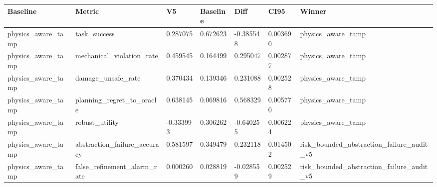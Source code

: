 \begin{tabular}{lllllll}
\toprule
Baseline & Metric & V5 & Baseline & Diff & CI95 & Winner \\
\midrule
physics\_aware\_tamp & task\_success & 0.287075 & 0.672623 & -0.385548 & 0.003690 & physics\_aware\_tamp \\
physics\_aware\_tamp & mechanical\_violation\_rate & 0.459545 & 0.164499 & 0.295047 & 0.002877 & physics\_aware\_tamp \\
physics\_aware\_tamp & damage\_unsafe\_rate & 0.370434 & 0.139346 & 0.231088 & 0.002528 & physics\_aware\_tamp \\
physics\_aware\_tamp & planning\_regret\_to\_oracle & 0.638145 & 0.069816 & 0.568329 & 0.005770 & physics\_aware\_tamp \\
physics\_aware\_tamp & robust\_utility & -0.333993 & 0.306262 & -0.640255 & 0.006224 & physics\_aware\_tamp \\
physics\_aware\_tamp & abstraction\_failure\_accuracy & 0.581597 & 0.349479 & 0.232118 & 0.014502 & risk\_bounded\_abstraction\_failure\_audit\_v5 \\
physics\_aware\_tamp & false\_refinement\_alarm\_rate & 0.000260 & 0.028819 & -0.028559 & 0.002529 & risk\_bounded\_abstraction\_failure\_audit\_v5 \\
\bottomrule
\end{tabular}
